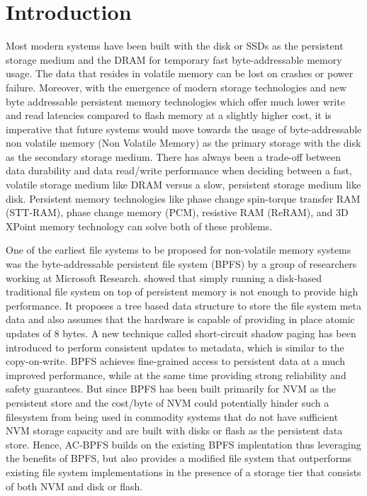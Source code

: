 \section{Introduction}
\label{sec-intro}
Most modern systems have been built with the disk or SSDs as the persistent storage medium and the DRAM for temporary fast byte-addressable memory usage. The data that resides in volatile memory can be lost on crashes or power failure. Moreover, with the emergence of modern storage technologies and new byte addressable persistent memory technologies which offer much lower write and read latencies compared to flash memory at a slightly higher cost, it is imperative that future systems would move towards the usage of byte-addressable non volatile memory (Non Volatile Memory) as the primary storage with the disk as the secondary storage medium. There has always been a trade-off between data durability and data read/write performance when deciding between a fast, volatile storage medium like DRAM versus a slow, persistent storage medium like disk. Persistent memory technologies like phase change spin-torque transfer RAM (STT-RAM), phase change memory (PCM), resistive RAM (ReRAM), and 3D XPoint memory technology can solve both of these problems.

One of the earliest file systems to be proposed for non-volatile memory systems was the byte-addressable persistent file system (BPFS) \cite{c10} by a group of researchers working at Microsoft Research. \cite{c10} showed that simply running a disk-based traditional file system on top of persistent memory is not enough to provide high performance. It proposes a tree based data structure to store the file system meta data and also assumes that the hardware is capable of providing in place atomic updates of 8 bytes. A new technique called short-circuit shadow paging has been introduced to perform consistent updates to metadata, which is similar to the copy-on-write. BPFS achieves fine-grained access to persistent data at a much improved performance, while at the same time providing strong reliability and safety guarantees. But since BPFS has been built primarily for NVM as the persistent store and the cost/byte of NVM could potentially hinder such a filesystem from being used in commodity systems that do not have sufficient NVM storage capacity and are built with disks or flash as the persistent data store. Hence, AC-BPFS builds on the existing BPFS implentation thus leveraging the benefits of BPFS, but also provides a modified file system that outperforms existing file system implementations in the presence of a storage tier that consists of both NVM and disk or flash.

